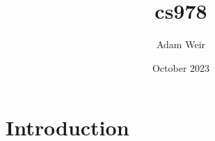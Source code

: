 \documentclass{article}
\title{cs978}
\author{Adam Weir}
\date{October 2023}
\begin{document}
\maketitle

\section{Introduction}
\end{document}
